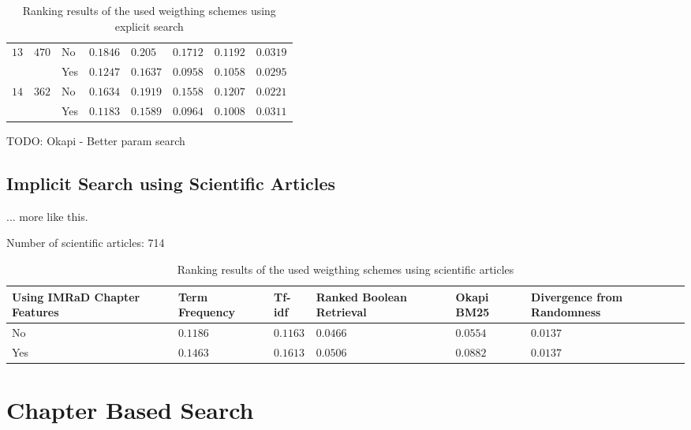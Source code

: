 \begin{table}[b]
\begin{adjustwidth}{-2cm}{}
\begin{tabular}{ c C{1.5cm} C{2.1cm} C{2.1cm} C{2.1cm} C{2.1cm} C{2.1cm} C{2.1cm} }
       &  & No  & $0.1846$ & $0.205$ & $0.1712$ & $0.1192$ & $0.0319$  \\
                                                    && Yes & $0.1247$ & $0.1637$ & $0.0958$ & $0.1058$ & $0.0295$  \\ \midrule
       &  & No  & $0.1634$ & $0.1919$ & $0.1558$ & $0.1207$ & $0.0221$  \\
                                                    && Yes & $0.1183$ & $0.1589$ & $0.0964$ & $0.1008$ & $0.0311$  \\
      \bottomrule
    \end{tabular}
  \caption[Ranking results with explicit search]{Ranking results of the used weigthing schemes using explicit search}
  \label{tbl:ranking_result_explicit}
  \end{adjustwidth}
\end{table}

TODO: Okapi - Better param search

\subsection{Implicit Search using Scientific Articles}

... more like this.

Number of scientific articles: 714

\begin{table}[b]
    \centering
    \begin{tabular}{ C{2.1cm} C{2.1cm} C{2.1cm} C{2.1cm} C{2.1cm} C{2.1cm} }
      \toprule
      \textbf{Using IMRaD Chapter Features} & \textbf{Term Frequency} & \textbf{Tf-idf} & \textbf{Ranked Boolean Retrieval} & \textbf{Okapi BM25} & \textbf{Divergence from Randomness} \\ \midrule
      No  & $0.1186$ & $0.1163$ & $0.0466$ & $0.0554$ & $0.0137$ \\
      Yes & $0.1463$ & $0.1613$ & $0.0506$ & $0.0882$ & $0.0137$ \\
      \bottomrule
    \end{tabular}
  \caption[Ranking results using scientific articles]{Ranking results of the used weigthing schemes using scientific articles}
  \label{tbl:ranking_result_full}
\end{table}


\section{Chapter Based Search}

